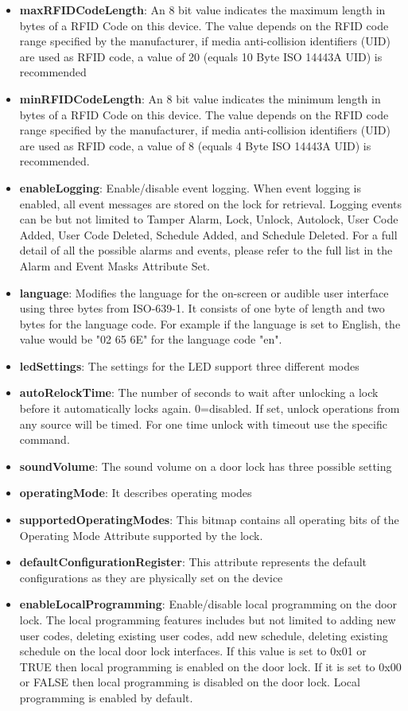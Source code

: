 \begin{itemize}
\item \textbf{maxRFIDCodeLength}: An 8 bit value indicates the maximum length in bytes of a RFID Code on this device. The value depends on the RFID code range specified by the manufacturer, if media anti-collision identifiers (UID) are used as RFID code, a value of 20 (equals 10 Byte ISO 14443A UID) is recommended
\item \textbf{minRFIDCodeLength}: An 8 bit value indicates the minimum length in bytes of a RFID Code on this device. The value depends on the RFID code range specified by the manufacturer, if media anti-collision identifiers (UID) are used as RFID code, a value of 8 (equals 4 Byte ISO 14443A UID) is recommended.
\item \textbf{enableLogging}: Enable/disable event logging. When event logging is enabled, all event messages are stored on the lock for retrieval. Logging events can be but not limited to Tamper Alarm, Lock, Unlock, Autolock, User Code Added, User Code Deleted, Schedule Added, and Schedule Deleted. For a full detail of all the possible alarms and events, please refer to the full list in the Alarm and Event Masks Attribute Set.
\item \textbf{language}: Modifies the language for the on-screen or audible user interface using three bytes from ISO-639-1. It consists of one byte of length and two bytes for the language code. For example if the language is set to English, the value would be "02 65 6E" for the language code "en".
\item \textbf{ledSettings}: The settings for the LED support three different modes
\item \textbf{autoRelockTime}: The number of seconds to wait after unlocking a lock before it automatically locks again. 0=disabled. If set, unlock operations from any source will be timed. For one time unlock with timeout use the specific command.
\item \textbf{soundVolume}: The sound volume on a door lock has three possible setting
\item \textbf{operatingMode}: It describes operating modes
\item \textbf{supportedOperatingModes}: This bitmap contains all operating bits of the Operating Mode Attribute supported by the lock.
\item \textbf{defaultConfigurationRegister}: This attribute represents the default configurations as they are physically set on the device
\item \textbf{enableLocalProgramming}: Enable/disable local programming on the door lock. The local programming features includes but not limited to adding new user codes, deleting existing user codes, add new schedule, deleting existing schedule on the local door lock interfaces. If this value is set to 0x01 or TRUE then local programming is enabled on the door lock. If it is set to 0x00 or FALSE then local programming is disabled on the door lock. Local programming is enabled by default.

\end{itemize}
